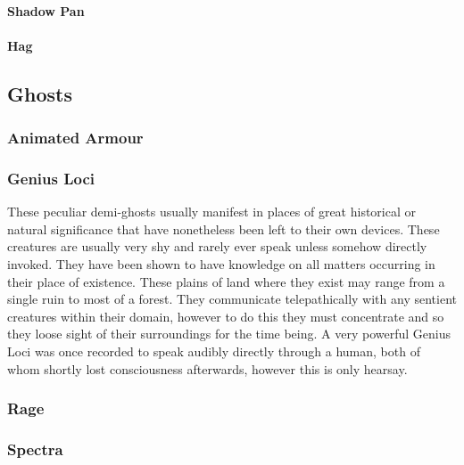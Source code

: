 \hypertarget{shadow-pan}{%
\paragraph{Shadow Pan}\label{shadow-pan}}

\hypertarget{hag}{%
\paragraph{Hag}\label{hag}}

\hypertarget{ghosts}{%
\subsection{Ghosts}\label{ghosts}}

\hypertarget{animated-armour}{%
\subsubsection{Animated Armour}\label{animated-armour}}

\hypertarget{genius-loci}{%
\subsubsection{Genius Loci}\label{genius-loci}}

These peculiar demi-ghosts usually manifest in places of great
historical or natural significance that have nonetheless been left to
their own devices. These creatures are usually very shy and rarely ever
speak unless somehow directly invoked. They have been shown to have
knowledge on all matters occurring in their place of existence. These
plains of land where they exist may range from a single ruin to most of
a forest. They communicate telepathically with any sentient creatures
within their domain, however to do this they must concentrate and so
they loose sight of their surroundings for the time being. A very
powerful Genius Loci was once recorded to speak audibly directly through
a human, both of whom shortly lost consciousness afterwards, however
this is only hearsay.

\hypertarget{rage}{%
\subsubsection{Rage}\label{rage}}

\hypertarget{spectra}{%
\subsubsection{Spectra}\label{spectra}}

